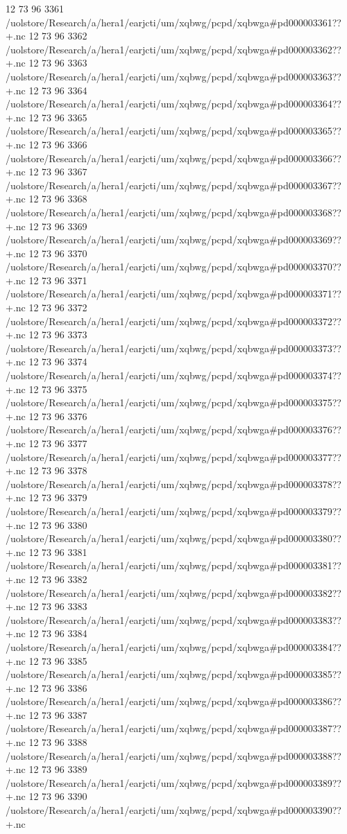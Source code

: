 12 73 96
3361
/uolstore/Research/a/hera1/earjcti/um/xqbwg/pcpd/xqbwga#pd000003361??+.nc
12 73 96
3362
/uolstore/Research/a/hera1/earjcti/um/xqbwg/pcpd/xqbwga#pd000003362??+.nc
12 73 96
3363
/uolstore/Research/a/hera1/earjcti/um/xqbwg/pcpd/xqbwga#pd000003363??+.nc
12 73 96
3364
/uolstore/Research/a/hera1/earjcti/um/xqbwg/pcpd/xqbwga#pd000003364??+.nc
12 73 96
3365
/uolstore/Research/a/hera1/earjcti/um/xqbwg/pcpd/xqbwga#pd000003365??+.nc
12 73 96
3366
/uolstore/Research/a/hera1/earjcti/um/xqbwg/pcpd/xqbwga#pd000003366??+.nc
12 73 96
3367
/uolstore/Research/a/hera1/earjcti/um/xqbwg/pcpd/xqbwga#pd000003367??+.nc
12 73 96
3368
/uolstore/Research/a/hera1/earjcti/um/xqbwg/pcpd/xqbwga#pd000003368??+.nc
12 73 96
3369
/uolstore/Research/a/hera1/earjcti/um/xqbwg/pcpd/xqbwga#pd000003369??+.nc
12 73 96
3370
/uolstore/Research/a/hera1/earjcti/um/xqbwg/pcpd/xqbwga#pd000003370??+.nc
12 73 96
3371
/uolstore/Research/a/hera1/earjcti/um/xqbwg/pcpd/xqbwga#pd000003371??+.nc
12 73 96
3372
/uolstore/Research/a/hera1/earjcti/um/xqbwg/pcpd/xqbwga#pd000003372??+.nc
12 73 96
3373
/uolstore/Research/a/hera1/earjcti/um/xqbwg/pcpd/xqbwga#pd000003373??+.nc
12 73 96
3374
/uolstore/Research/a/hera1/earjcti/um/xqbwg/pcpd/xqbwga#pd000003374??+.nc
12 73 96
3375
/uolstore/Research/a/hera1/earjcti/um/xqbwg/pcpd/xqbwga#pd000003375??+.nc
12 73 96
3376
/uolstore/Research/a/hera1/earjcti/um/xqbwg/pcpd/xqbwga#pd000003376??+.nc
12 73 96
3377
/uolstore/Research/a/hera1/earjcti/um/xqbwg/pcpd/xqbwga#pd000003377??+.nc
12 73 96
3378
/uolstore/Research/a/hera1/earjcti/um/xqbwg/pcpd/xqbwga#pd000003378??+.nc
12 73 96
3379
/uolstore/Research/a/hera1/earjcti/um/xqbwg/pcpd/xqbwga#pd000003379??+.nc
12 73 96
3380
/uolstore/Research/a/hera1/earjcti/um/xqbwg/pcpd/xqbwga#pd000003380??+.nc
12 73 96
3381
/uolstore/Research/a/hera1/earjcti/um/xqbwg/pcpd/xqbwga#pd000003381??+.nc
12 73 96
3382
/uolstore/Research/a/hera1/earjcti/um/xqbwg/pcpd/xqbwga#pd000003382??+.nc
12 73 96
3383
/uolstore/Research/a/hera1/earjcti/um/xqbwg/pcpd/xqbwga#pd000003383??+.nc
12 73 96
3384
/uolstore/Research/a/hera1/earjcti/um/xqbwg/pcpd/xqbwga#pd000003384??+.nc
12 73 96
3385
/uolstore/Research/a/hera1/earjcti/um/xqbwg/pcpd/xqbwga#pd000003385??+.nc
12 73 96
3386
/uolstore/Research/a/hera1/earjcti/um/xqbwg/pcpd/xqbwga#pd000003386??+.nc
12 73 96
3387
/uolstore/Research/a/hera1/earjcti/um/xqbwg/pcpd/xqbwga#pd000003387??+.nc
12 73 96
3388
/uolstore/Research/a/hera1/earjcti/um/xqbwg/pcpd/xqbwga#pd000003388??+.nc
12 73 96
3389
/uolstore/Research/a/hera1/earjcti/um/xqbwg/pcpd/xqbwga#pd000003389??+.nc
12 73 96
3390
/uolstore/Research/a/hera1/earjcti/um/xqbwg/pcpd/xqbwga#pd000003390??+.nc
